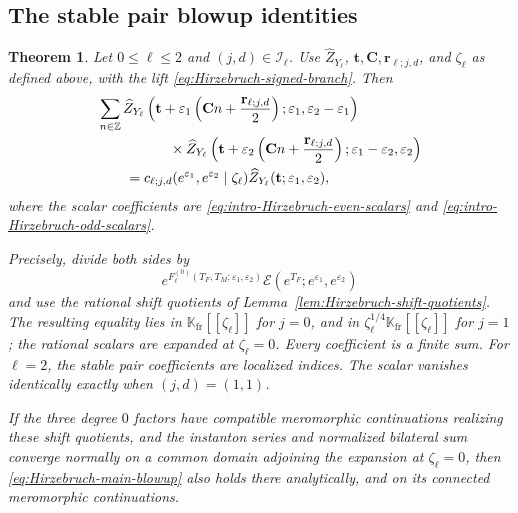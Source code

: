 \documentclass{amsart}
\newtheorem{theorem}{Theorem}
\theoremstyle{definition}
\numberwithin{equation}{section}
\newcommand{\Z}{\mathbb Z}
\newcommand{\K}{\mathbb K}
\newcommand{\eps}{\varepsilon}
\begin{document}
\subsection{The stable pair blowup identities}

\begin{theorem}\label{thm:Hirzebruch-main}
Let \(0\leq\ell\leq2\) and \((j,d)\in\mathcal I_\ell\).  Use \(\widehat Z_{Y_\ell}\), \(\mathbf t,\mathbf C,\mathbf r_{\ell;j,d}\), and \(\zeta_\ell\) as defined above, with the lift \eqref{eq:Hirzebruch-signed-branch}.  Then
\begin{equation}
\begin{aligned}
 &\sum_{n\in\Z}
 \widehat Z_{Y_\ell}\left(
 \mathbf t+\eps_1\left(\mathbf Cn+
 \frac{\mathbf r_{\ell;j,d}}2\right);
 \eps_1,\eps_2-\eps_1\right)\\
 &\hspace{18mm}\times
 \widehat Z_{Y_\ell}\left(
 \mathbf t+\eps_2\left(\mathbf Cn+
 \frac{\mathbf r_{\ell;j,d}}2\right);
 \eps_1-\eps_2,\eps_2\right)\\
 &\qquad=
 c_{\ell;j,d}(e^{\eps_1},e^{\eps_2}\mid\zeta_\ell)
 \widehat Z_{Y_\ell}(\mathbf t;\eps_1,\eps_2),
\end{aligned}
\label{eq:Hirzebruch-main-blowup}
\end{equation}
where the scalar coefficients are \eqref{eq:intro-Hirzebruch-even-scalars} and \eqref{eq:intro-Hirzebruch-odd-scalars}.

Precisely, divide both sides by
\[
 e^{F_\ell^{(0)}(T_F,T_M;\eps_1,\eps_2)}
 \mathcal E(e^{T_F};e^{\eps_1},e^{\eps_2})
\]
and use the rational shift quotients of Lemma~\ref{lem:Hirzebruch-shift-quotients}.  The resulting equality lies in \(\K_{\mathrm{fr}}[[\zeta_\ell]]\) for \(j=0\), and in \(\zeta_\ell^{1/4}\K_{\mathrm{fr}}[[\zeta_\ell]]\) for \(j=1\); the rational scalars are expanded at \(\zeta_\ell=0\).  Every coefficient is a finite sum.  For \(\ell=2\), the stable pair coefficients are localized indices.  The scalar vanishes identically exactly when \((j,d)=(1,1)\).

If the three degree \(0\) factors have compatible meromorphic continuations realizing these shift quotients, and the instanton series and normalized bilateral sum converge normally on a common domain adjoining the expansion at \(\zeta_\ell=0\), then \eqref{eq:Hirzebruch-main-blowup} also holds there analytically, and on its connected meromorphic continuations.
\end{theorem}
\end{document}
